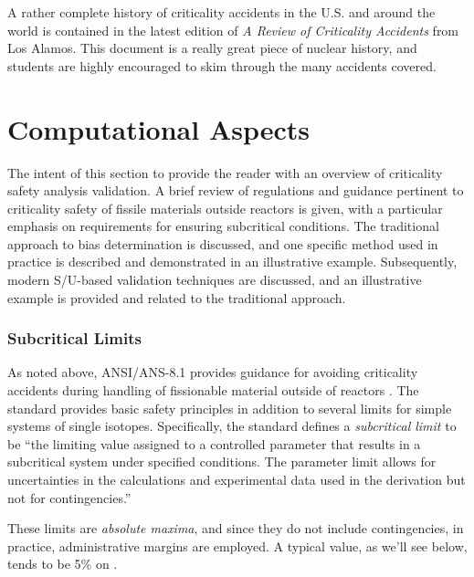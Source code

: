 A rather complete history of criticality accidents in the U.S. and
around the world is contained in the latest edition of
 \textit{A Review of Criticality Accidents} from Los Alamos.  This
document is a really great piece of nuclear history, and students
are highly encouraged to skim through the many accidents covered.


\section*{Computational Aspects}

The intent of this section to provide the reader with an 
overview of criticality safety analysis validation. A brief 
review of regulations and guidance pertinent to criticality safety of 
fissile materials outside reactors is given, with a particular emphasis on 
requirements for ensuring subcritical conditions. The traditional approach to 
bias determination is discussed, and one specific method used in practice
is described and demonstrated in an illustrative example. Subsequently, 
modern S/U-based validation techniques are discussed, and an 
illustrative example is provided and related to the traditional approach.


\subsubsection{Subcritical Limits}

As noted above, ANSI/ANS-8.1 provides guidance 
for avoiding criticality accidents during handling of fissionable material 
outside of reactors \cite{ans8_1}. The standard provides basic safety principles 
in addition to several limits for simple systems of single isotopes.  
Specifically, the standard defines a \textit{subcritical limit} to be ``the 
limiting value assigned to a controlled parameter that results in a subcritical 
system under specified conditions. The parameter limit allows for 
uncertainties in the calculations and experimental data used in the derivation 
but not for contingencies.''

These limits are \textit{absolute maxima}, and since they do not include 
contingencies, in practice, administrative margins are employed.  A typical 
value, as we'll see below, tends to be 5\% on \keff.

